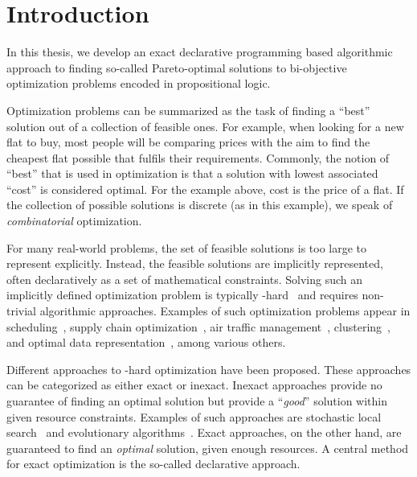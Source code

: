 \chapter{Introduction\label{chap:intro}}

In this thesis, we develop an exact declarative programming based algorithmic approach to finding so-called Pareto-optimal solutions to bi-objective optimization problems encoded in propositional logic.

Optimization problems can be summarized as the task of finding a ``best'' solution out of a collection of feasible ones.
For example, when looking for a new flat to buy, most people will be comparing prices with the aim to find the cheapest flat possible that fulfils their requirements.
Commonly, the notion of ``best'' that is used in optimization is that a solution with lowest associated ``cost'' is considered optimal.
For the example above, cost is the price of a flat.
If the collection of possible solutions is discrete (as in this example), we speak of \emph{combinatorial} optimization.

For many real-world problems, the set of feasible solutions is too large to represent explicitly.
Instead, the feasible solutions are implicitly represented, often declaratively as a set of mathematical constraints.
Solving such an implicitly defined optimization problem is typically \NP-hard~\autocite{AroraBarak2009-complexity} and requires non-trivial algorithmic approaches.
Examples of such optimization problems appear in scheduling~\autocites{DBLP:conf/cp/Stojadinovic14,DBLP:conf/cpaior/BofillGSV15,DBLP:journals/ior/Solomon87,DBLP:journals/candie/AkyolB07}, supply chain optimization~\autocite{DBLP:journals/cce/Papageorgiou09}, air traffic management~\autocites{DBLP:journals/ior/BertsimasLO11,RichardsHow2002Aircrafttrajectoryplanning}, clustering~\autocite{DBLP:journals/ai/DaoDV17,DBLP:conf/sdm/DavidsonRS10}, and optimal data representation~\autocites{DBLP:conf/cp/MaliotovM18,DBLP:conf/ijcai/NarodytskaIPM18,DBLP:conf/ijcai/Hu0HH20,DBLP:conf/cp/YuISB20,DBLP:conf/aaai/DemirovicS21,DBLP:conf/cp/ShatiCM21,DBLP:conf/cade/IgnatievPNM18}, among various others.

Different approaches to \NP-hard optimization have been proposed.
These approaches can be categorized as either exact or inexact.
Inexact approaches provide no guarantee of finding an optimal solution but provide a ``\emph{good}'' solution within given resource constraints.
Examples of such approaches are stochastic local search~\autocites{DBLP:books/daglib/0017492,DBLP:conf/evoW/Dubois-LacosteLS12,DBLP:journals/eor/Dubois-LacosteL15,DBLP:journals/eor/Jaszkiewicz18} and evolutionary algorithms~\autocite{DBLP:books/daglib/0087893,DBLP:journals/jgo/StornP97}.
Exact approaches, on the other hand, are guaranteed to find an \emph{optimal} solution, given enough resources.
A central method for exact optimization is the so-called declarative approach.

